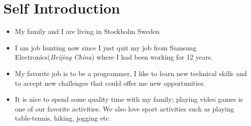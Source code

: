 \documentclass{article}
\begin{document}
\section{ Self Introduction}
\begin{itemize}
\item{My family and I are living in Stockholm Sweden}
\item{I am job hunting now since I just quit my job from Samsung Electronics(\textit{Beijing China}) where I had been working for 12 years.}

\item{My favorite job is to be a programmer, I like to learn new technical skills and to accept new challenges that could offer me new opportunities.}

\item{It is nice to spend some quality time with my family; playing video games is one of our favorite activities. We also love sport activities such as playing table-tennis, hiking, jogging etc.}
\end{itemize}
\end{document}
